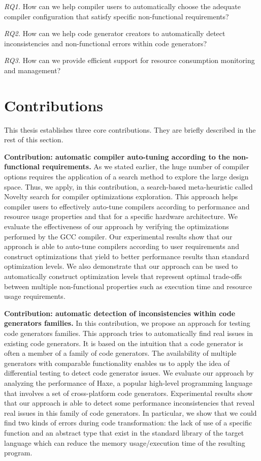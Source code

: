 \textit{RQ1.} How can we help compiler users to automatically choose the adequate compiler configuration that satisfy specific non-functional requirements?

\textit{RQ2.} How can we help code generator creators to automatically detect inconsistencies and non-functional errors within code generators?

\textit{RQ3.} How can we provide efficient support for resource consumption monitoring and management?


\section{Contributions}
This thesis establishes three core contributions. They are briefly described in the rest of this section.

\textbf{Contribution: automatic compiler auto-tuning according to the non-functional requirements.}
As we stated earlier, the huge number of compiler options requires the application of a search method to explore the large design space. Thus, we apply, in this contribution, a search-based meta-heuristic called Novelty search for compiler optimizations exploration. This approach helps compiler users to effectively auto-tune compilers according to performance and resource usage properties and that for a specific hardware architecture. 
We evaluate the effectiveness of our approach by verifying the optimizations performed by the GCC compiler.
Our experimental results show that our approach is able to auto-tune compilers according to user requirements and construct optimizations that yield to better performance results than standard optimization levels. We also demonstrate that our approach can be used to automatically construct optimization levels that represent optimal trade-offs between multiple non-functional properties such as execution time and resource usage requirements.

\textbf{Contribution: automatic detection of inconsistencies within code generators families.}
In this contribution, we propose an approach for testing code generators families. This approach tries to automatically find real issues in existing code generators. 
It is based on the intuition that a code generator is often a member of a family of code generators. The availability of multiple generators with comparable functionality enables us to apply the idea of differential testing\cite{mckeeman1998differential} to detect code generator issues.
We evaluate our approach by analyzing the performance of Haxe, a popular high-level programming language that involves a set of cross-platform code generators. Experimental results show that our approach is able to detect some performance inconsistencies that reveal real issues in this family of code generators.
In particular, we show that we could find two kinds of errors during code transformation: the lack of use of a specific function and an abstract type that exist in the standard library of the target language which can reduce the memory usage/execution time of the resulting program.

